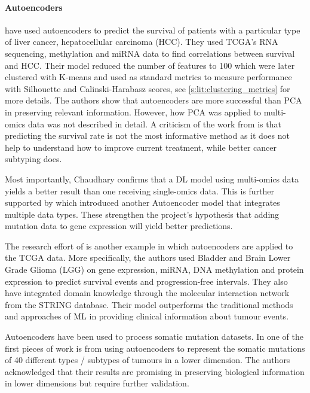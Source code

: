 \paragraph*{Autoencoders} \label{s:lit:autoencoders}

\citet{Chaudhary2018-qj} have used autoencoders to predict the survival of patients with a particular type of liver cancer, hepatocellular carcinoma (HCC). They used TCGA's RNA sequencing, methylation and miRNA data to find correlations between survival and HCC. Their model reduced the number of features to 100 which were later clustered with K-means and used as standard metrics to measure performance with Silhouette and Calinski-Harabasz scores, see \cref{s:lit:clustering_metrics} for more details. The authors show that autoencoders are more successful than PCA in preserving relevant information. However, how PCA was applied to multi-omics data was not described in detail. A criticism of the work from \citeauthor{Chaudhary2018-qj} is that predicting the survival rate is not the most informative method as it does not help to understand how to improve current treatment, while better cancer subtyping does.

Most importantly, Chaudhary confirms that a DL model using multi-omics data yields a better result than one receiving single-omics data. This is further supported by \citet{Ma2019-hk} which introduced another Autoencoder model that integrates multiple data types. These strengthen the project's hypothesis that adding mutation data to gene expression will yield better predictions.

The research effort of \citet{Ma2019-hk} is another example in which autoencoders are applied to the TCGA data. More specifically, the authors used Bladder and Brain Lower Grade Glioma (LGG) on gene expression, miRNA, DNA methylation and protein expression to predict survival events and progression-free intervals. They also have integrated domain knowledge through the molecular interaction network from the STRING database. Their model outperforms the traditional methods and approaches of ML in providing clinical information about tumour events.

Autoencoders have been used to process somatic mutation datasets. In one of the first pieces of work is from \cite{Palazzo2019-hx} using autoencoders to represent the somatic mutations of 40 different types / subtypes of tumours in a lower dimension. The authors acknowledged that their results are promising in preserving biological information in lower dimensions but require further validation.

